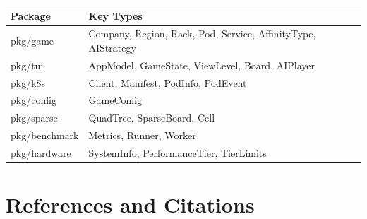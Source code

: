 \documentclass[11pt]{article}
\begin{document}
\begin{longtable}{@{}ll@{}}
\toprule
\textbf{Package} & \textbf{Key Types} \\
\midrule
\endhead
pkg/game & Company, Region, Rack, Pod, Service, AffinityType, AIStrategy \\
pkg/tui & AppModel, GameState, ViewLevel, Board, AIPlayer \\
pkg/k8s & Client, Manifest, PodInfo, PodEvent \\
pkg/config & GameConfig \\
pkg/sparse & QuadTree, SparseBoard, Cell \\
pkg/benchmark & Metrics, Runner, Worker \\
pkg/hardware & SystemInfo, PerformanceTier, TierLimits \\
\bottomrule
\end{longtable}


\section*{References and Citations}

\end{document}
